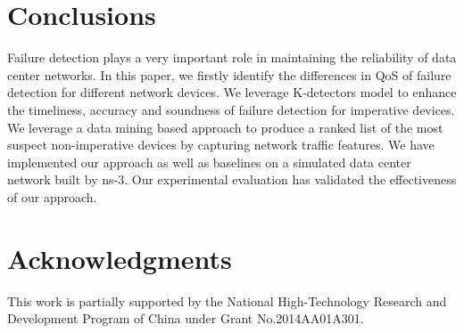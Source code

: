 \documentclass{sig-alternate-05-2015}
\begin{document}
\section{Conclusions}
Failure detection plays a very important role in maintaining the reliability of data center networks. In this paper, we firstly identify the differences in QoS of failure detection for different network devices. We leverage K-detectors model to enhance the timeliness, accuracy and soundness of failure detection for imperative devices. We leverage a data mining based approach to produce a ranked list of the most suspect non-imperative devices by capturing network traffic features. We have implemented our approach as well as baselines on a simulated data center network built by ns-3. Our experimental evaluation has validated the effectiveness of our approach.


\section{Acknowledgments}
This work is partially supported by the National High-Technology Research and Development Program of China under Grant No.2014AA01A301.



  
\end{document}

